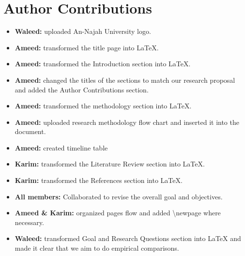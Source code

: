 \documentclass{article}
\begin{document}
\section{Author Contributions}
\begin{itemize}
    \item \textbf{Waleed:} uploaded An-Najah University logo.
    \item \textbf{Ameed:} transformed the title page into LaTeX.
    \item \textbf{Ameed:} transformed the Introduction section into LaTeX.
    \item \textbf{Ameed:} changed the titles of the sections to match our research proposal and added the Author Contributions section.
    \item \textbf{Ameed:} transformed the methodology section into LaTeX.
    \item \textbf{Ameed:} uploaded research methodology flow chart and inserted it into the document.
    \item \textbf{Ameed:} created timeline table
    \item \textbf{Karim:} transformed the Literature Review section into LaTeX.
    \item \textbf{Karim:} transformed the References section into LaTeX.
    \item \textbf{All members:} Collaborated to revise the overall goal and objectives.
    \item \textbf{Ameed \& Karim:} organized pages flow and added \textbackslash newpage where necessary.
    \item \textbf{Waleed:} transformed Goal and Research Questions section into LaTeX and made it clear that we aim to do empirical comparisons.
\end{itemize}


\newpage


\end{document}
